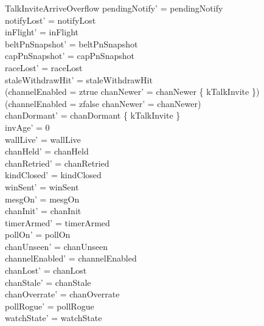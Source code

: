 \documentclass[a4paper,10pt,fleqn]{article}
\begin{document}
\begin{schema}{TalkInviteArriveOverflow}
  pendingNotify' = pendingNotify \\
  notifyLost' = notifyLost \\
  inFlight' = inFlight \\
  beltPnSnapshot' = beltPnSnapshot \\
  capPnSnapshot' = capPnSnapshot \\
  raceLost' = raceLost \\
  staleWithdrawHit' = staleWithdrawHit \\
  (channelEnabled = ztrue \implies
  chanNewer' = chanNewer \cup \{ kTalkInvite \}) \\
  (channelEnabled = zfalse \implies chanNewer' = chanNewer) \\
  chanDormant' = chanDormant \setminus \{ kTalkInvite \} \\
  invAge' = 0 \\
  wallLive' = wallLive \\
  chanHeld' = chanHeld \\
  chanRetried' = chanRetried \\
  kindClosed' = kindClosed \\
  winSent' = winSent \\
  mesgOn' = mesgOn \\
  chanInit' = chanInit \\
  timerArmed' = timerArmed \\
  pollOn' = pollOn \\
  chanUnseen' = chanUnseen \\
  channelEnabled' = channelEnabled \\
  chanLost' = chanLost \\
  chanStale' = chanStale \\
  chanOverrate' = chanOverrate \\
  pollRogue' = pollRogue \\
  watchState' = watchState
\end{schema}
\end{document}
